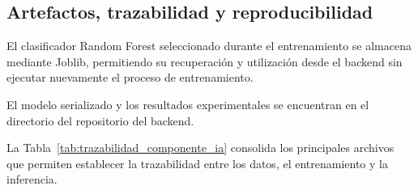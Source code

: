 
\subsection{Artefactos, trazabilidad y reproducibilidad}
\label{subsec:artefactos_entrenamiento}
\label{subsec:trazabilidad_reproducibilidad_ia}

El clasificador Random Forest seleccionado durante el entrenamiento se almacena mediante Joblib, permitiendo su recuperación y utilización desde el backend sin ejecutar nuevamente el proceso de entrenamiento.

El modelo serializado y los resultados experimentales se encuentran en el directorio  del repositorio del backend.

La Tabla~\ref{tab:trazabilidad_componente_ia} consolida los principales archivos que permiten establecer la trazabilidad entre los datos, el entrenamiento y la inferencia.

